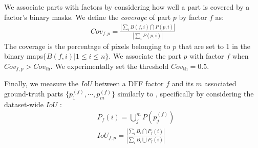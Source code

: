 \documentclass[runningheads]{llncs}
\begin{document}
	We associate parts with factors by considering how well a part is covered by a factor's binary masks. We define the \emph{coverage} of part $p$ by factor $f$ as:
	\begin{align}
	Cov_{f,p} = \frac{|\sum_i B(f,i) \bigcap P(p,i)|}{|\sum_i P(p,i)|}
	\end{align}
	The coverage is the percentage of pixels belonging to $p$ that are set to 1 in the binary maps$\{B(f,i) | 1\leq i\leq n\}$. We associate the part $p$ with factor $f$ when  $Cov_{f,p}>Cov_{\text{th}}$. We experimentally set the threshold $Cov_{\text{th}}=0.5$.
	
	Finally, we measure the $IoU$ between a DFF factor $f$ and its $m$ associated ground-truth parts $\{p^{(f)}_1,\cdots,p^{(f)}_m\}$ similarly to \cite{Bau2017}, specifically by considering the dataset-wide $IoU$ :
	\begin{align}
	&P_f(i) = \bigcup_j^m P(p^{(f)}_j) \\
	&IoU_{f,p} = \frac{|\sum_i B_i \bigcap P_f(i)|}{|\sum_i B_i \bigcup P_f(i)|}
	\end{align}
	
\end{document}
